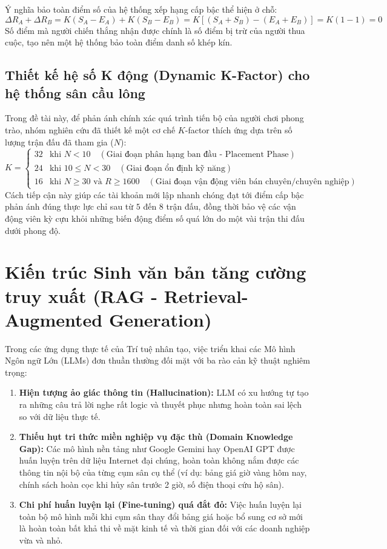 Ý nghĩa bảo toàn điểm số của hệ thống xếp hạng cấp bậc thể hiện ở chỗ:
\begin{equation}
    \Delta R_A + \Delta R_B = K(S_A - E_A) + K(S_B - E_B) = K[(S_A + S_B) - (E_A + E_B)] = K(1 - 1) = 0
\end{equation}
Số điểm mà người chiến thắng nhận được chính là số điểm bị trừ của người thua cuộc, tạo nên một hệ thống bảo toàn điểm danh số khép kín.

\subsection{Thiết kế hệ số K động (Dynamic K-Factor) cho hệ thống sân cầu lông}
Trong đề tài này, để phản ánh chính xác quá trình tiến bộ của người chơi phong trào, nhóm nghiên cứu đã thiết kế một cơ chế $K$-factor thích ứng dựa trên số lượng trận đấu đã tham gia ($N$):
\begin{equation}
    K = \begin{cases}
        32 & \text{khi } N < 10 \quad (\text{Giai đoạn phân hạng ban đầu - Placement Phase}) \\
        24 & \text{khi } 10 \le N < 30 \quad (\text{Giai đoạn ổn định kỹ năng}) \\
        16 & \text{khi } N \ge 30 \text{ và } R \ge 1600 \quad (\text{Giai đoạn vận động viên bán chuyên/chuyên nghiệp})
    \end{cases}
\end{equation}
Cách tiếp cận này giúp các tài khoản mới lập nhanh chóng đạt tới điểm cấp bậc phản ánh đúng thực lực chỉ sau từ $5$ đến $8$ trận đấu, đồng thời bảo vệ các vận động viên kỳ cựu khỏi những biến động điểm số quá lớn do một vài trận thi đấu dưới phong độ.

\section{Kiến trúc Sinh văn bản tăng cường truy xuất (RAG - Retrieval-Augmented Generation)}
\label{sec:lythuyet_rag}

Trong các ứng dụng thực tế của Trí tuệ nhân tạo, việc triển khai các Mô hình Ngôn ngữ Lớn (LLMs) đơn thuần thường đối mặt với ba rào cản kỹ thuật nghiêm trọng:
\begin{enumerate}[label=\alph*)]
    \item \textbf{Hiện tượng ảo giác thông tin (Hallucination):} LLM có xu hướng tự tạo ra những câu trả lời nghe rất logic và thuyết phục nhưng hoàn toàn sai lệch so với dữ liệu thực tế.
    \item \textbf{Thiếu hụt tri thức miền nghiệp vụ đặc thù (Domain Knowledge Gap):} Các mô hình nền tảng như Google Gemini hay OpenAI GPT được huấn luyện trên dữ liệu Internet đại chúng, hoàn toàn không nắm được các thông tin nội bộ của từng cụm sân cụ thể (ví dụ: bảng giá giờ vàng hôm nay, chính sách hoàn cọc khi hủy sân trước 2 giờ, số điện thoại cứu hộ sân).
    \item \textbf{Chi phí huấn luyện lại (Fine-tuning) quá đắt đỏ:} Việc huấn luyện lại toàn bộ mô hình mỗi khi cụm sân thay đổi bảng giá hoặc bổ sung cơ sở mới là hoàn toàn bất khả thi về mặt kinh tế và thời gian đối với các doanh nghiệp vừa và nhỏ.
\end{enumerate}

